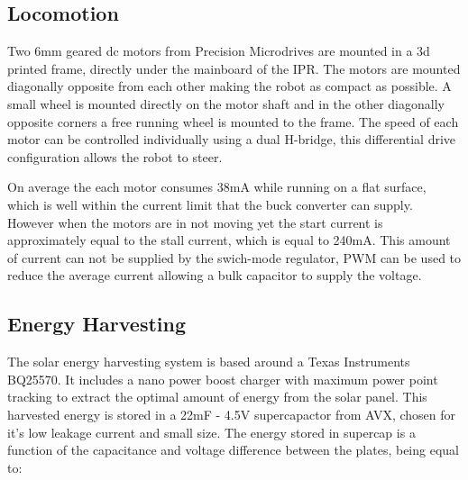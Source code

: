 \subsection{Locomotion}

Two 6mm geared dc motors from Precision Microdrives are mounted in a 3d printed frame, directly under the mainboard of the IPR.
The motors are mounted diagonally opposite from each other making the robot as compact as possible.
A small wheel is mounted directly on the motor shaft and in the other diagonally opposite corners a free running wheel is mounted to the frame.
The speed of each motor can be controlled individually using a dual H-bridge, this differential drive configuration allows the robot to steer.

On average the each motor consumes 38mA while running on a flat surface, which is well within the current limit that the buck converter can supply.
However when the motors are in not moving yet the start current is approximately equal to the stall current, which is equal to 240mA.
This amount of current can not be supplied by the swich-mode regulator, PWM can be used to reduce the average current allowing a bulk capacitor to supply the voltage.

\subsection{Energy Harvesting}
\label{subsec:energy_harvesting}




The solar energy harvesting system is based around a Texas Instruments BQ25570. 
It includes a nano power boost charger with maximum power point tracking to extract the optimal amount of energy from the solar panel. 
This harvested energy is stored in a 22mF - 4.5V supercapactor from AVX, chosen for it's low leakage current and small size.
The energy stored in supercap is a function of the capacitance and voltage difference between the plates, being equal to:

